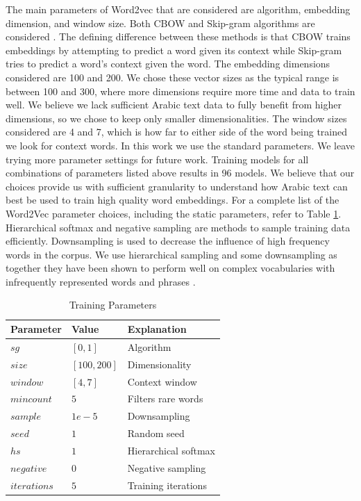 The main parameters of Word2vec that are considered are algorithm, embedding dimension, and window size. Both CBOW and Skip-gram algorithms are considered \cite{mikoloveffic:2013}. The defining difference between these methods is that CBOW trains embeddings by attempting to predict a word given its context while Skip-gram tries to predict a word's context given the word. The embedding dimensions considered are 100 and 200. We chose these vector sizes as the typical range is between 100 and 300, where more dimensions require more time and data to train well. We believe we lack sufficient Arabic text data to fully benefit from higher dimensions, so we chose to keep only smaller dimensionalities. The window sizes considered are 4 and 7, which is how far to either side of the word being trained we look for context words. %
In this work we use the standard parameters. We leave trying more parameter settings for future work. Training models for all combinations of parameters listed above results in 96 models. %
We believe that our choices provide us with sufficient granularity to understand how Arabic text can best be used to train high quality word embeddings. For a complete list of the Word2Vec parameter choices, including the static parameters, refer to Table \ref{table:params}. Hierarchical softmax and negative sampling are methods to sample training data efficiently. Downsampling is used to decrease the influence of high frequency words in the corpus. We use hierarchical sampling and some downsampling as together they have been shown to perform well on complex vocabularies with infrequently represented words and phrases \cite{mikolovdist:2013}.

\begin{table}
\begin{center}
\begin{tabular}{l|l|l}
\textbf{Parameter} & \textbf{Value} & \textbf{Explanation} \\
\hline
$sg$ & $[0,1]$ & Algorithm \\
$size$ & $[100, 200]$ & Dimensionality \\
$window$ & $[4, 7]$ & Context window \\
$min count$ & $5$ & Filters rare words \\
$sample$ & $1e-5$ & Downsampling \\
$seed$ & $1$ & Random seed \\
$hs$ & $1$ & Hierarchical softmax \\
$negative$ & $0$ & Negative sampling \\
$iterations$ & $5$ & Training iterations \\
\end{tabular}
\caption{Training Parameters}
\label{table:params}
\end{center}
\end{table}
